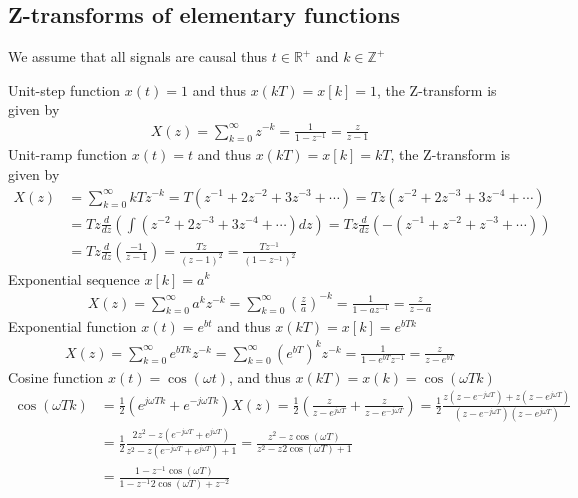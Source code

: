 \documentclass[twoside]{article}
\begin{document}
\subsection*{Z-transforms of elementary functions}

We assume that all signals are causal thus $t \in \mathbb{R}^+$
and $k \in \mathbb{Z}^+$

Unit-step function $x(t) = 1$ and thus $x(kT) = x[k] = 1$, the
Z-transform is given by
%
\begin{align*}
 X(z) = \sum\limits_{k=0}^{\infty} z^{-k} = \frac{1}{1 - z^{-1}} =
  \frac{z}{z - 1}
\end{align*}
%
Unit-ramp function $x(t) = t$ and thus $x(kT) = x[k] = kT$, the
Z-transform is given by
%
\begin{align*}
 X(z) &= \sum\limits_{k=0}^{\infty} kT z^{-k} = T (z^{-1} + 2 z^{-2}  +
  3 z^{-3}  + \cdots) 
= T z (z^{-2} + 2 z^{-3}  +
  3 z^{-4}  + \cdots) \\ &= T z \frac{d}{dz} \left( 
 \int (z^{-2} + 2 z^{-3}  + 3 z^{-4}  + \cdots) dz \right)
= T z \frac{d}{dz} \left( 
  -(z^{-1} + z^{-2}  + z^{-3}  + \cdots) \right)
\\
&= T z \frac{d}{dz} \left(  \frac{-1}{z-1} \right)  = \frac{T
  z}{(z-1)^2} =
\frac{T z^{-1}}{(1 - z^{-1})^2} 
\end{align*}
%
Exponential sequence $x[k] = a^k$
%
\begin{align*}
 X(z) = \sum\limits_{k=0}^{\infty} a^k z^{-k} =
  \sum\limits_{k=0}^{\infty} \left( \frac{z}{a} \right)^{-k} = 
\frac{1}{1 - a z^{-1}} = \frac{z}{z - a}
\end{align*}
%
Exponential function $x(t) = e^{b t}$ and thus $x(k T) = x[k] = e^{b T
  k}$
%
\begin{align*}
 X(z) = \sum\limits_{k=0}^{\infty} e^{b T k} z^{-k} = \sum\limits_{k=0}^{\infty} (e^{b T})^k z^{-k}
= \frac{1}{1 - e^{b T} z^{-1}} = \frac{z}{z - e^{b T}}
\end{align*}
%
Cosine function $x(t) = \cos (\omega t)$, and thus $x(k T) = x(k) =
\cos (\omega T k)$
%
\begin{align*}
\cos (\omega T k) &= \frac{1}{2} \left( e^{j \omega T k} + e^{-j \omega T k} \right)
 X(z) = \frac{1}{2} \left( \frac{z}{z - e^{j \omega T}} +  \frac{z}{z
  - e^{-j \omega T}} \right) = 
\frac{1}{2} \frac{z(z - e^{-j \omega T}) + z(z - e^{j \omega T})}{(z
  - e^{-j \omega T}) (z - e^{j \omega T})}
\\
&= \frac{1}{2} \frac{2 z^2 - z(e^{-j \omega T} + e^{j \omega T})}{z^2
  -z (e^{-j \omega T} + e^{j \omega T}) + 1}
= \frac{z^2 - z \cos(\omega T)}{z^2 - z 2 \cos (\omega T)+ 1}
\\ &= \frac{1 - z^{-1} \cos(\omega T)}{1 - z^{- 1} 2 \cos (\omega T) + z^{-2}}
\end{align*}
%
\end{document}

